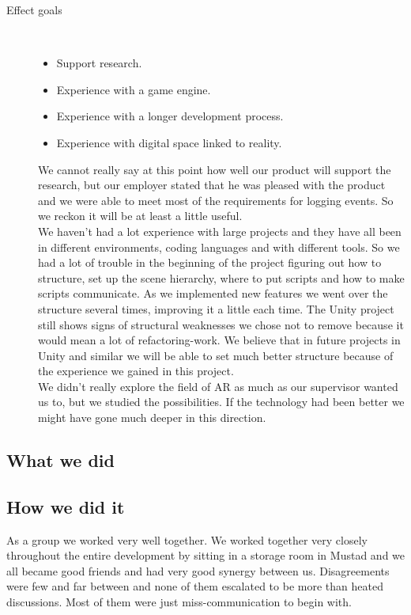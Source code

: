 \begin{description}
	\item[Effect goals]\ 
	\begin{itemize}
		\item Support research.
		\item Experience with a game engine.
		\item Experience with a longer development process.
		\item Experience with digital space linked to reality.
	\end{itemize}
	We cannot really say at this point how well our product will support the research, but our employer stated that he was pleased with the product and we were able to meet most of the requirements for logging events. 
	So we reckon it will be at least a little useful.\\
	We haven't had a lot experience with large projects and they have all been in different environments, coding languages and with different tools. 
	So we had a lot of trouble in the beginning of the project figuring out how to structure, set up the scene hierarchy, where to put scripts and how to make scripts communicate.
	As we implemented new features we went over the structure several times, improving it a little each time. 
	The Unity project still shows signs of structural weaknesses we chose not to remove because it would mean a lot of refactoring-work. 
	We believe that in future projects in Unity and similar we will be able to set much better structure because of the experience we gained in this project.\\
	We didn't really explore the field of AR as much as our supervisor wanted us to, but we studied the possibilities. 
	If the technology had been better we might have gone much deeper in this direction.


\end{description}


\subsection{What we did}

\subsection{How we did it}
As a group we worked very well together.
We worked together very closely throughout the entire development by sitting in a storage room in Mustad and we all became good friends and had very good synergy between us.
Disagreements were few and far between and none of them escalated to be more than heated discussions. Most of them were just miss-communication to begin with. 

